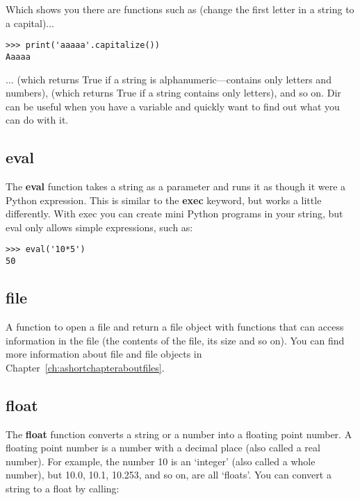 Which shows you there are functions such as  (change the first letter in a string to a capital)$\ldots$

\begin{listing}
\begin{verbatim}
>>> print('aaaaa'.capitalize())
Aaaaa
\end{verbatim}
\end{listing}

$\ldots$ (which returns True if a string is alphanumeric---contains only letters and numbers),  (which returns True if a string contains only letters), and so on. Dir can be useful when you have a variable and quickly want to find out what you can do with it.

\subsection*{eval}

The \textbf{eval} function takes a string as a parameter and runs it as though it were a Python expression.  This is similar to the \textbf{exec} keyword, but works a little differently.  With exec you can create mini Python programs in your string, but eval only allows simple expressions, such as:

\begin{listing}
\begin{verbatim}
>>> eval('10*5')
50
\end{verbatim}
\end{listing}

\subsection*{file}

A function to open a file and return a file object with functions that can access information in the file (the contents of the file, its size and so on). You can find more information about file and file objects in Chapter~\ref{ch:ashortchapteraboutfiles}.

\subsection*{float}

The \textbf{float} function converts a string or a number into a floating point number. A floating point number is a number with a decimal place (also called a real number). For example, the number 10 is an `integer' (also called a whole number), but 10.0, 10.1, 10.253, and so on, are all `floats'. You can convert a string to a float by calling:

